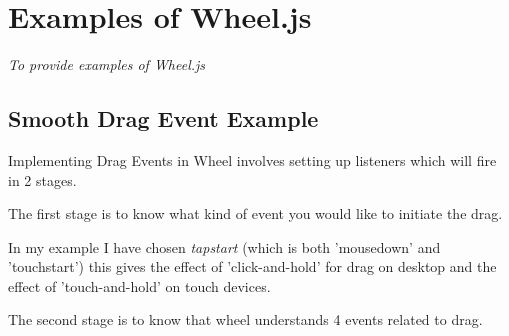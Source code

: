 
\chapter{Examples of Wheel.js}
\begin{center}
{\small\em To provide examples of Wheel.js}
\end{center}

\section{Smooth Drag Event Example} %
\label{sec:Smooth Drag Event Example}

 Implementing Drag Events in Wheel involves setting up listeners which will
 fire in 2 stages.

 

 The first stage is to know what kind of event you would like to initiate the drag.

 In my example I have chosen \emph{tapstart} (which is both 'mousedown' and 'touchstart') 
 this gives the effect of 'click-and-hold' for drag on desktop and
 the effect of 'touch-and-hold' on touch devices.

 The second stage is to know that wheel understands 4 events related to drag.

